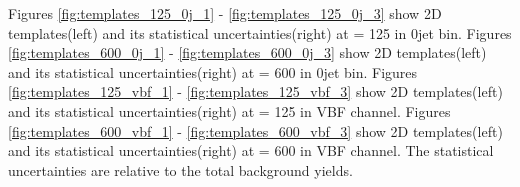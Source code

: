 Figures \ref{fig:templates_125_0j_1} - \ref{fig:templates_125_0j_3} show 2D templates(left) and 
its statistical uncertainties(right) at \mHi = 125 \GeV in 0jet bin. 
Figures \ref{fig:templates_600_0j_1} - \ref{fig:templates_600_0j_3} show 2D templates(left) and 
its statistical uncertainties(right) at \mHi = 600 \GeV in 0jet bin. 
Figures \ref{fig:templates_125_vbf_1} - \ref{fig:templates_125_vbf_3} show 2D templates(left) and 
its statistical uncertainties(right) at \mHi = 125 \GeV in VBF channel. 
Figures \ref{fig:templates_600_vbf_1} - \ref{fig:templates_600_vbf_3} show 2D templates(left) and 
its statistical uncertainties(right) at \mHi = 600 \GeV in VBF channel. 
The statistical uncertainties are relative to the total background yields. 
